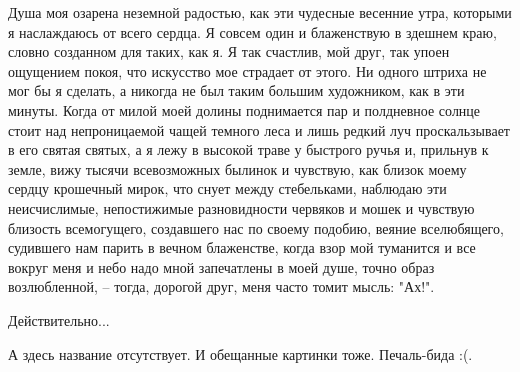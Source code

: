 Душа моя озарена неземной радостью, как эти чудесные весенние утра, которыми я
наслаждаюсь от всего сердца. Я совсем один и блаженствую в здешнем краю, словно
созданном для таких, как я. Я так счастлив, мой друг, так упоен ощущением покоя,
что искусство мое страдает от этого. Ни одного штриха не мог бы я сделать, а
никогда не был таким большим художником, как в эти минуты. Когда от милой моей
долины поднимается пар и полдневное солнце стоит над непроницаемой чащей темного
леса и лишь редкий луч проскальзывает в его святая святых, а я лежу в высокой
траве у быстрого ручья и, прильнув к земле, вижу тысячи всевозможных былинок и
чувствую, как близок моему сердцу крошечный мирок, что снует между стебельками,
наблюдаю эти неисчислимые, непостижимые разновидности червяков и мошек и
чувствую близость всемогущего, создавшего нас по своему подобию, веяние
вселюбящего, судившего нам парить в вечном блаженстве, когда взор мой туманится
и все вокруг меня и небо надо мной запечатлены в моей душе, точно образ
возлюбленной, -- тогда, дорогой друг, меня часто томит мысль: "Ах!".

\sources

Действительно...

А здесь название отсутствует. И обещанные картинки тоже. Печаль-бида :(.


